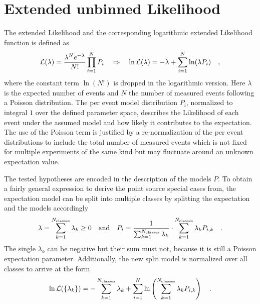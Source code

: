\section{Extended unbinned Likelihood}
The extended Likelihood  and the corresponding logarithmic extended Likelihood function is defined as
\begin{equation}
  \mathcal{L}(\lambda) = \frac{\lambda^N e^{-\lambda}}{N!}\prod_{i=1}^N P_i
  \quad\Rightarrow\quad
    \ln\mathcal{L}(\lambda) = -\lambda+\sum_{i=1}^N \ln(\lambda P_i)
  \quad\text{,}
\end{equation}
where the constant term $\ln(N!)$ is dropped in the logarithmic version.
Here $\lambda$ is the expected number of events and $N$ the number of measured events following a Poisson distribution.
The per event model distribution $P_i$, normalized to integral $1$ over the defined parameter space, describes the Likelihood of each event under the assumed model and how likely it contributes to the expectation.
The use of the Poisson term is justified by a re-normalization of the per event distributions to include the total number of measured events which is not fixed for multiple experiments of the same kind but may fluctuate around an unknown expectation value.

The tested hypotheses are encoded in the description of the models $P$.
To obtain a fairly general expression to derive the point source special cases from, the expectation model can be split into multiple classes by splitting the expectation and the models accordingly
\begin{equation}
  \lambda = \sum_{k=1}^{N_\text{classes}} \lambda_k \geq 0
  \quad\text{and}\quad
  P_i = \frac{1}{\sum_{k=1}^{N_\text{classes}} \lambda_k}\cdot
         \sum_{k=1}^{N_\text{classes}} \lambda_k P_{i,k}
  \quad\text{.}
\end{equation}
The single $\lambda_k$ can be negative but their sum must not, because it is still a Poisson expectation parameter.
Additionally, the new split model is normalized over all classes to arrive at the form
\begin{equation}
  \label{equ:extended_llh}
  \ln\mathcal{L}(\{\lambda_k\})
  = -\sum_{k=1}^{N_\text{classes}} \lambda_k +
    \sum_{i=1}^N \ln\left(\sum_{k=1}^{N_\text{classes}}
      \lambda_k P_{i,k} \right)
  \quad\text{.}
\end{equation}

